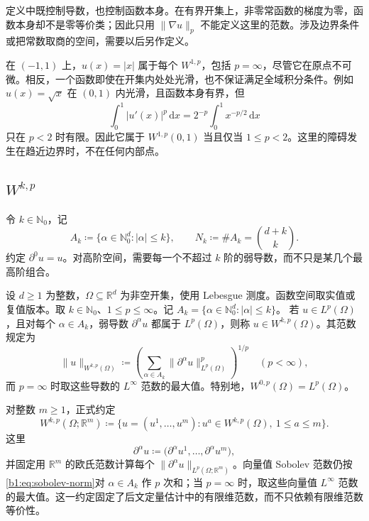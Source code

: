 \ProseParagraphBreak

定义中既控制导数，也控制函数本身。在有界开集上，非零常函数的梯度为零，函数本身却不是零等价类；因此只用 \(\|\nabla u\|_p\) 不能定义这里的范数。涉及边界条件或把常数取商的空间，需要以后另作定义。

\ProseParagraphBreak

在 \((-1,1)\) 上，\(u(x)=|x|\) 属于每个 \(W^{1,p}\)，包括 \(p=\infty\)，尽管它在原点不可微。相反，一个函数即使在开集内处处光滑，也不保证满足全域积分条件。例如 \(u(x)=\sqrt{x}\) 在 \((0,1)\) 内光滑，且函数本身有界，但
\[
 \int_0^1|u'(x)|^p\,\mathrm dx
 =2^{-p}\int_0^1x^{-p/2}\,\mathrm dx
\]
只在 \(p<2\) 时有限。因此它属于 \(W^{1,p}(0,1)\) 当且仅当 \(1\le p<2\)。这里的障碍发生在趋近边界时，不在任何内部点。

\subsection{\texorpdfstring{\(W^{k,p}\)}{Wk,p}}
\label{b1:subsec:210102}

令 \(k\in\mathbb N_0\)，记
\[
 A_k\coloneqq\{\alpha\in\mathbb N_0^d:|\alpha|\le k\},
 \qquad N_k\coloneqq\#A_k=\binom{d+k}{k}.
\]
约定 \(\partial^0u=u\)。对高阶空间，需要每一个不超过 \(k\) 阶的弱导数，而不只是某几个最高阶组合。

\begin{definition}\label{b1:def:sobolev-higher-order}
设 \(d\geq1\) 为整数，\(\Omega\subseteq\mathbb R^d\) 为非空开集，使用 Lebesgue 测度。函数空间取实值或复值版本。取 \(k\in\mathbb N_0\)、\(1\leq p\leq\infty\)。记 \(A_k=\{\alpha\in\mathbb N_0^d:|\alpha|\leq k\}\)。
若 \(u\in L^p(\Omega)\)，且对每个 \(\alpha\in A_k\)，弱导数 \(\partial^\alpha u\) 都属于 \(L^p(\Omega)\)，则称 \(u\in W^{k,p}(\Omega)\)。其范数规定为
\begin{equation}\label{b1:eq:sobolev-norm}
 \|u\|_{W^{k,p}(\Omega)}
 \coloneqq\left(\sum_{\alpha\in A_k}
              \|\partial^\alpha u\|_{L^p(\Omega)}^p\right)^{1/p}
 \quad(p<\infty),
\end{equation}
而 \(p=\infty\) 时取这些导数的 \(L^\infty\) 范数的最大值。特别地，\(W^{0,p}(\Omega)=L^p(\Omega)\)。
\end{definition}

对整数 \(m\geq1\)，正式约定
\[
 W^{k,p}(\Omega;\mathbb R^m)
 \coloneqq\bigl\{u=(u^1,\ldots,u^m):u^a\in W^{k,p}(\Omega),\ 1\leq a\leq m\bigr\}.
\]
这里
\[
 \partial^\alpha u
 \coloneqq\bigl(\partial^\alpha u^1,\ldots,\partial^\alpha u^m\bigr),
\]
并固定用 \(\mathbb R^m\) 的欧氏范数计算每个 \(\|\partial^\alpha u\|_{L^p(\Omega;\mathbb R^m)}\)。向量值 Sobolev 范数仍按\eqref{b1:eq:sobolev-norm}对 \(\alpha\in A_k\) 作 \(p\) 次和；当 \(p=\infty\) 时，取这些向量值 \(L^\infty\) 范数的最大值。这一约定固定了后文定量估计中的有限维范数，而不只依赖有限维范数等价性。

